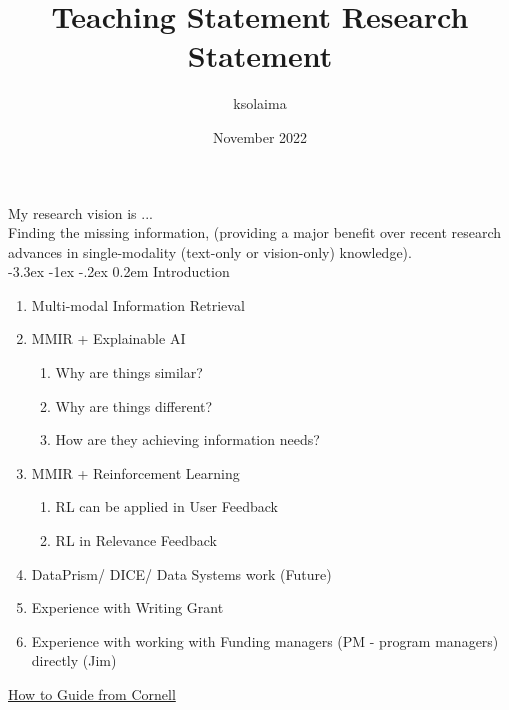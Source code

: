 \documentclass[11pt]{article}
\title{
\vspace{-3em}
\textbf{Teaching Statement} \hfill \href{https://ksolaiman.github.io/}{\textit{\Name}}
\vspace{-2.5em}
}
\date{}
\title{Research Statement}
\author{ksolaima }
\date{November 2022}
\makeatletter
\def \section {%
    \@startsection {section}
    {1}%
    {\z@}%
    {-3.3ex \@plus -1ex \@minus -.2ex}%
    {0.2em}
    {\normalfont \Large \scshape \bfseries} %
    }
\makeatother
\begin{document}
\maketitle

My research vision is ...\\
Finding the missing information, (providing a major benefit over recent
research advances in single-modality (text-only or vision-only) knowledge).\\

\section{Introduction}
\begin{enumerate}
    \item Multi-modal Information Retrieval
    \item MMIR + Explainable AI 
    \begin{enumerate}
        \item Why are things similar?
        \item Why are things different?
        \item How are they achieving information needs?
    \end{enumerate}
    \item MMIR + Reinforcement Learning 
    \begin{enumerate}
        \item RL can be applied in User Feedback
        \item RL in Relevance Feedback 
    \end{enumerate}
    \item DataPrism/ DICE/ Data Systems work (Future)
    \item Experience with Writing Grant 
    \item Experience with working with Funding managers (PM - program managers) directly (Jim) 
\end{enumerate}


\href{https://gradschool.cornell.edu/career-and-professional-development/pathways-to-success/prepare-for-your-career/take-action/research-statement/}{How to Guide from Cornell}
\end{document}
